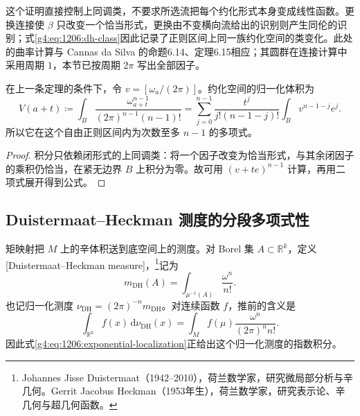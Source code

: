 这个证明直接控制上同调类，不要求所选流把每个约化形式本身变成线性函数。更换连接使 \(\beta\) 只改变一个恰当形式，更换由不变横向流给出的识别则产生同伦的识别；式\eqref{g4:eq:1206:dh-class}因此记录了正则区间上同一族约化空间的类变化。此处的曲率计算与 Cannas da Silva 的命题6.14、定理6.15相应；其圆群在连接计算中采用周期 \(1\)，本节已按周期 \(2\pi\) 写出全部因子。\cite[第6.6节，第179--180页]{Cannas2006Symplectic}

\begin{corollary}\label{g4:cor:1206:reduced-volume-polynomial}
	在上一条定理的条件下，令 \(v=[\omega_a/(2\pi)]\)。约化空间的归一化体积为
	\begin{equation}\label{g4:eq:1206:reduced-volume-polynomial}
		V(a+t)\coloneqq
		\int_B\frac{\omega_{a+t}^{n-1}}{(2\pi)^{n-1}(n-1)!}
		=\sum_{j=0}^{n-1}
		\frac{t^j}{j!(n-1-j)!}\int_B v^{n-1-j}e^j.
	\end{equation}
	所以它在这个自由正则区间内为次数至多 \(n-1\) 的多项式。
\end{corollary}
\begin{proof}
	积分只依赖闭形式的上同调类：将一个因子改变为恰当形式，与其余闭因子的乘积仍恰当，在紧无边界 \(B\) 上积分为零。故可用 \((v+te)^{n-1}\) 计算，再用二项式展开得到公式。
\end{proof}

\subsection{Duistermaat–Heckman 测度的分段多项式性}
\label{g4:subsec:1206:04}
矩映射把 \(M\) 上的辛体积送到底空间上的测度。对 Borel 集 \(A\subset\mathbb R^k\)，定义[Duistermaat--Heckman measure]，\footnote{Johannes Jisse Duistermaat（1942--2010），荷兰数学家，研究微局部分析与辛几何。Gerrit Jacobus Heckman（1953年生），荷兰数学家，研究表示论、辛几何与超几何函数。}记为
\begin{equation}\label{g4:eq:1206:dh-measure}
	m_{\mathrm{DH}}(A)=\int_{\mu^{-1}(A)}\frac{\omega^n}{n!}.
\end{equation}
也记归一化测度 \(\nu_{\mathrm{DH}}=(2\pi)^{-n}m_{\mathrm{DH}}\)。对连续函数 \(f\)，推前的含义是
\[
	\int_{\mathbb R^k}f(x)\,\mathrm{d}\nu_{\mathrm{DH}}(x)
	=\int_M f(\mu)\frac{\omega^n}{(2\pi)^n n!}.
\]
因此式\eqref{g4:eq:1206:exponential-localization}正给出这个归一化测度的指数积分。

